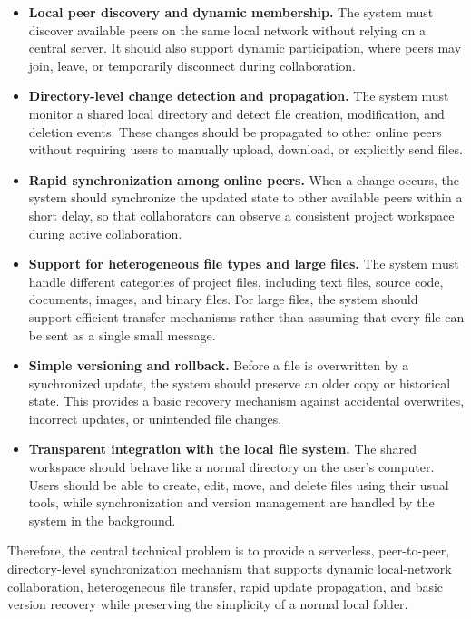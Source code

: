 \documentclass[11pt,oneside]{article}
\begin{document}
\begin{itemize}
\item \textbf{Local peer discovery and dynamic membership.}
The system must discover available peers on the same local network without relying on a central server. It should also support dynamic participation, where peers may join, leave, or temporarily disconnect during collaboration.

\item \textbf{Directory-level change detection and propagation.}
The system must monitor a shared local directory and detect file creation, modification, and deletion events. These changes should be propagated to other online peers without requiring users to manually upload, download, or explicitly send files.

\item \textbf{Rapid synchronization among online peers.}
When a change occurs, the system should synchronize the updated state to other available peers within a short delay, so that collaborators can observe a consistent project workspace during active collaboration.

\item \textbf{Support for heterogeneous file types and large files.}
The system must handle different categories of project files, including text files, source code, documents, images, and binary files. For large files, the system should support efficient transfer mechanisms rather than assuming that every file can be sent as a single small message.

\item \textbf{Simple versioning and rollback.}
Before a file is overwritten by a synchronized update, the system should preserve an older copy or historical state. This provides a basic recovery mechanism against accidental overwrites, incorrect updates, or unintended file changes.

\item \textbf{Transparent integration with the local file system.}
The shared workspace should behave like a normal directory on the user's computer. Users should be able to create, edit, move, and delete files using their usual tools, while synchronization and version management are handled by the system in the background.
\end{itemize}
Therefore, the central technical problem is to provide a serverless, peer-to-peer, directory-level synchronization mechanism that supports dynamic local-network collaboration, heterogeneous file transfer, rapid update propagation, and basic version recovery while preserving the simplicity of a normal local folder. 
\end{document}
